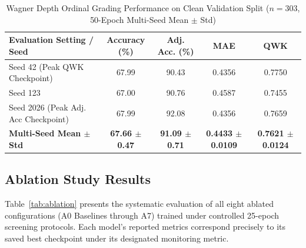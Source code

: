 \documentclass[journal]{IEEEtran}
\begin{document}
\begin{table}[h]
\centering
\caption{Wagner Depth Ordinal Grading Performance on Clean Validation Split ($n=303$, 50-Epoch Multi-Seed Mean $\pm$ Std)}
\label{tab:wagner_results}
\begin{tabular}{lcccc}
\toprule
\textbf{Evaluation Setting / Seed} & \textbf{Accuracy (\%)} & \textbf{Adj. Acc. (\%)} & \textbf{MAE} & \textbf{QWK} \\
\midrule
Seed 42 (Peak QWK Checkpoint) & 67.99 & 90.43 & 0.4356 & 0.7750 \\
Seed 123 & 67.00 & 90.76 & 0.4587 & 0.7455 \\
Seed 2026 (Peak Adj. Acc Checkpoint) & 67.99 & 92.08 & 0.4356 & 0.7659 \\
\midrule
\textbf{Multi-Seed Mean $\pm$ Std} & \textbf{67.66 $\pm$ 0.47} & \textbf{91.09 $\pm$ 0.71} & \textbf{0.4433 $\pm$ 0.0109} & \textbf{0.7621 $\pm$ 0.0124} \\
\bottomrule
\end{tabular}
\end{table}

\subsection{Ablation Study Results}
Table~\ref{tab:ablation} presents the systematic evaluation of all eight ablated configurations (A0 Baselines through A7) trained under controlled 25-epoch screening protocols. Each model's reported metrics correspond precisely to its saved best checkpoint under its designated monitoring metric.
\end{document}
